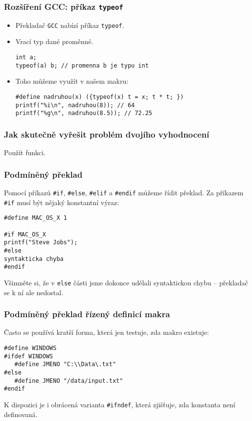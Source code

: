 \documentclass{beamer}
\newenvironment{itemizex}%
  {\large \begin{itemize}%
    \setlength{\itemsep}{8pt}%
    \setlength{\parskip}{8pt}}%
  {\end{itemize}}
\begin{document}
\begin{frame}[t,fragile]\frametitle{Rozšíření GCC: příkaz \texttt{typeof}} 
    \begin{itemizex}
        \item Překladač \texttt{GCC} nabízí příkaz \texttt{typeof}. 
        \item Vrací typ dané proměnné. 
\begin{verbatim} 
int a;
typeof(a) b; // promenna b je typu int
\end{verbatim}
        \item Toho můžeme využít v našem makru:
\begin{verbatim} 
#define nadruhou(x) ({typeof(x) t = x; t * t; })
printf("%i\n", nadruhou(8)); // 64
printf("%g\n", nadruhou(8.5)); // 72.25
\end{verbatim}
    \end{itemizex}
\end{frame}


\begin{frame}[t,fragile]\frametitle{Jak skutečně vyřešit problém dvojího vyhodnocení} 
Použít funkci.
\end{frame}


\begin{frame}[t,fragile]\frametitle{Podmíněný překlad} 
Pomocí příkazů \texttt{\#if}, \texttt{\#else}, \texttt{\#elif} a \texttt{\#endif} můžeme řídit překlad. Za příkazem \texttt{\#if} musí být nějaký konstantní výraz:
\begin{verbatim} 
#define MAC_OS_X 1

#if MAC_OS_X
printf("Steve Jobs");
#else
syntakticka chyba
#endif
\end{verbatim}

Všimněte si, že v \texttt{else} části jsme dokonce udělali syntaktickou chybu -- překladač se k ní ale nedostal. 
\end{frame}


\begin{frame}[t,fragile]\frametitle{Podmíněný překlad řízený definicí makra} 
Často se používá kratší forma, která jen testuje, zda makro existuje:

\begin{verbatim} 
#define WINDOWS
#ifdef WINDOWS
   #define JMENO "C:\\Data\.txt"
#else
   #define JMENO "/data/input.txt"
#endif
\end{verbatim}

K dispozici je i obrácená varianta \texttt{\#ifndef}, která zjišťuje, zda konstanta není definovaná.
\end{frame}
\end{document}
